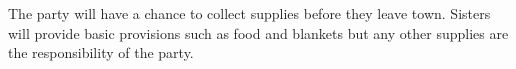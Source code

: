The party will have a chance to collect supplies before they leave town.
Sisters will provide basic provisions such as food and blankets but any other supplies are the responsibility of the party.
